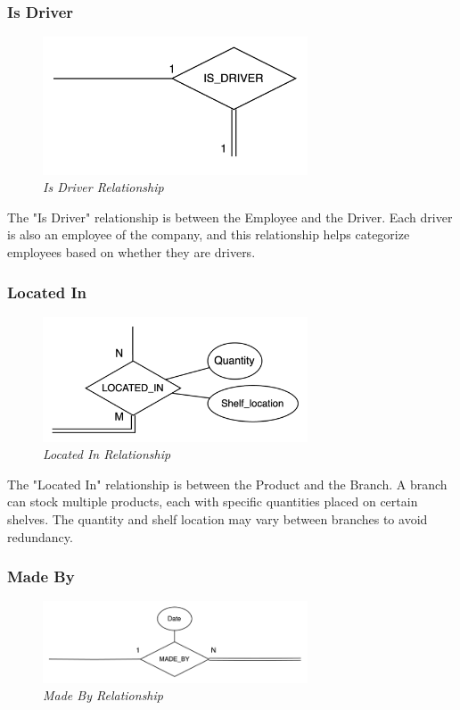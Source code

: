 \subsubsection{Is Driver}
\begin{figure}[H]
  \centering
  \includegraphics[width=0.7\textwidth]{images/relationships/is_driver.png}
  \caption{\textit{Is Driver Relationship}}
\end{figure}

The "Is Driver" relationship is between the Employee and the Driver. Each driver is also an employee of the company, and this relationship helps categorize employees based on whether they are drivers.

\subsubsection{Located In}
\begin{figure}[H]
  \centering
  \includegraphics[width=0.7\textwidth]{images/relationships/located_in.png}
  \caption{\textit{Located In Relationship}}
\end{figure}

The "Located In" relationship is between the Product and the Branch. A branch can stock multiple products, each with specific quantities placed on certain shelves. The quantity and shelf location may vary between branches to avoid redundancy.

\subsubsection{Made By}
\begin{figure}[H]
  \centering
  \includegraphics[width=0.7\textwidth]{images/relationships/made_by.png}
  \caption{\textit{Made By Relationship}}
\end{figure}

